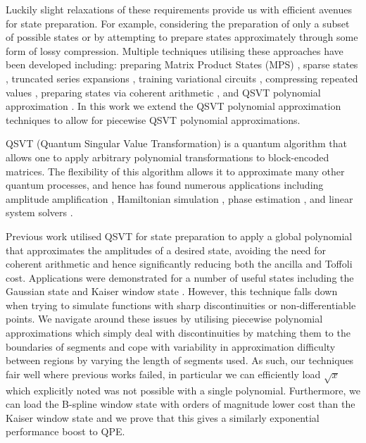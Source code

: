 \documentclass[aps,prx,twocolumn,floatfix,10pt,amssymb,amsfont,amsmath,superscriptaddress,float,nofootinbib,longbibliography,nobalancelastpage]{revtex4-2}
\theoremstyle{empty}
\begin{document}
Luckily slight relaxations of these requirements provide us with efficient avenues for state preparation. For example, considering the preparation of only a subset of possible states or by attempting to prepare states approximately through some form of lossy compression. Multiple techniques utilising these approaches have been developed including: preparing Matrix Product States (MPS) \cite{Ran_2020, 9259933, Melnikov_2023, PhysRevA.101.010301, PhysRevResearch.4.043007, Iaconis:2023rna, PhysRevLett.132.040404}, sparse states \cite{Zhang2022}, truncated series expansions \cite{Welch_2014, Zylberman:2023knk, Moosa:2023ecz}, training variational circuits \cite{Zoufal_2019, Nakaji:2021dew, Marin-Sanchez:2021ast}, compressing repeated values \cite{Sunderhauf:2023xrz, PhysRevResearch.5.013200}, preparing states via coherent arithmetic \cite{Bhaskar:2015jjo, Haner:2018yea}, and QSVT polynomial approximation \cite{mcardleQuantumStatePreparation2022, Gonzalez-Conde:2023fjg}. In this work we extend the QSVT polynomial approximation techniques to allow for piecewise QSVT polynomial approximations.

QSVT (Quantum Singular Value Transformation) \cite{Gilyen:2018khw} is a quantum algorithm that allows one to apply arbitrary polynomial transformations to block-encoded matrices. The flexibility of this algorithm allows it to approximate many other quantum processes, and hence has found numerous applications including amplitude amplification  \cite{Gilyen:2018khw}, Hamiltonian simulation  \cite{Gilyen:2018khw}, phase estimation \cite{Martyn:2021eaf}, and linear system solvers \cite{Gilyen:2018khw}. 

Previous work utilised QSVT for state preparation to apply a global polynomial that approximates the amplitudes of a desired state, avoiding the need for coherent arithmetic and hence significantly reducing both the ancilla and Toffoli cost. Applications were demonstrated for a number of useful states including the Gaussian state and Kaiser window state \cite{mcardleQuantumStatePreparation2022}. However, this technique falls down when trying to simulate functions with sharp discontinuities or non-differentiable points. We navigate around these issues by utilising piecewise polynomial approximations which simply deal with discontinuities by matching them to the boundaries of segments and cope with variability in approximation difficulty between regions by varying the length of segments used. As such, our techniques fair well where previous works failed, in particular we can efficiently load $\sqrt{x}$ which \cite{mcardleQuantumStatePreparation2022} explicitly noted was not possible with a single polynomial. Furthermore, we can load the B-spline window state with orders of magnitude lower cost than the Kaiser window state and we prove that this gives a similarly exponential performance boost to QPE. 
\end{document}
